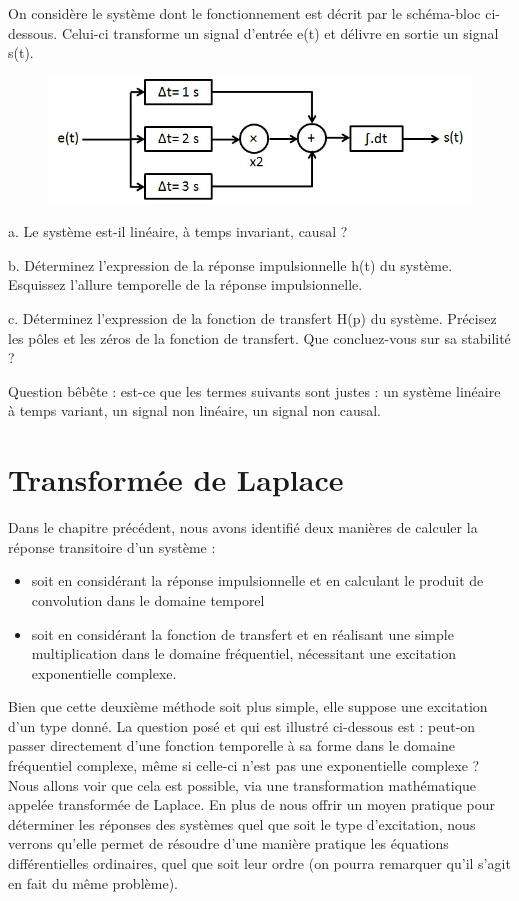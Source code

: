 \documentclass[]{book}
\begin{document}
{	On considère le système dont le fonctionnement est décrit par le schéma-bloc ci-dessous. Celui-ci transforme un signal d'entrée e(t) et délivre en sortie un signal s(t). 
	
	\begin{figure}[h!]
		\centering
		\includegraphics[scale=0.5]{images/Exo_2_6.jpg} 
	\end{figure}
	
	a. Le système est-il linéaire, à temps invariant, causal ?
	
	b. Déterminez l'expression de la réponse impulsionnelle h(t) du système. Esquissez l'allure temporelle de la réponse impulsionnelle. 
	
	c. Déterminez l'expression de la fonction de transfert H(p) du système. Précisez les pôles et les zéros de la fonction de transfert. Que concluez-vous sur sa stabilité ?
	
	\vspace{1\baselineskip}
	
	Question bêbête : est-ce que les termes suivants sont justes : un système linéaire à temps variant, un signal non linéaire, un signal non causal.


	\newpage
	
	
\chapter{Transformée de Laplace}	
	
	
	Dans le chapitre précédent, nous avons identifié deux manières de calculer la réponse transitoire d'un système :
	\begin{itemize}
		\item soit en considérant la réponse impulsionnelle et en calculant le produit de convolution dans le domaine temporel
		\item soit en considérant la fonction de transfert et en réalisant une simple multiplication dans le domaine fréquentiel, nécessitant une excitation exponentielle complexe.
	\end{itemize}

	Bien que cette deuxième méthode soit plus simple, elle suppose une excitation d'un type donné. La question posé et qui est illustré ci-dessous est : peut-on passer directement d'une fonction temporelle à sa forme dans le domaine fréquentiel complexe, même si celle-ci n'est pas une exponentielle complexe ? Nous allons voir que cela est possible, via une transformation mathématique appelée transformée de Laplace. En plus de nous offrir un moyen pratique pour déterminer les réponses des systèmes quel que soit le type d'excitation, nous verrons  qu'elle permet de résoudre d'une manière pratique les équations différentielles ordinaires, quel que soit leur ordre (on pourra remarquer qu'il s'agit en fait du même problème). 
	
}
\end{document}
